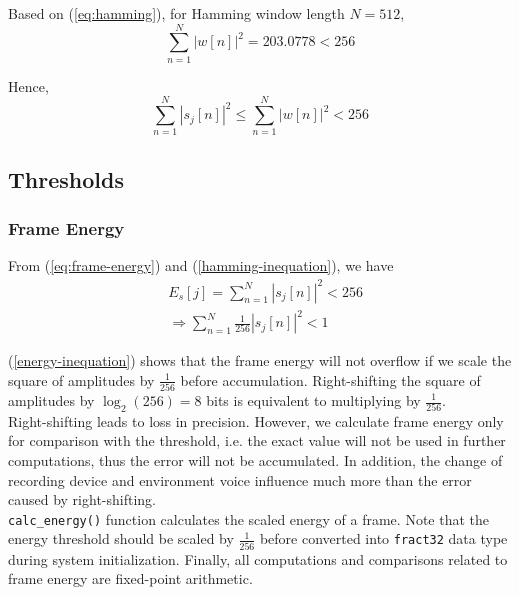 Based on (\ref{eq:hamming}), for Hamming window length $N = 512$,
\begin{equation}
\sum_{n=1}^{N} |w[n]|^2 = 203.0778 < 256
\end{equation}

Hence,
\begin{equation}
\label{hamming-inequation}
\sum_{n=1}^{N} |s_j[n]|^2 \le \sum_{n=1}^{N} |w[n]|^2 < 256
\end{equation}


\subsection{Thresholds}
\subsubsection{Frame Energy}

From (\ref{eq:frame-energy}) and (\ref{hamming-inequation}), we have
\begin{align}
\label{energy-inequation}
&E_s[j] = \sum_{n=1}^{N} |s_j[n]|^2 < 256\\
&\Longrightarrow \sum_{n=1}^{N} \frac{1}{256} |s_j[n]|^2 < 1
\end{align}

(\ref{energy-inequation}) shows that the frame energy will not overflow if we scale the square of amplitudes by $\frac{1}{256}$ before accumulation. Right-shifting the square of amplitudes by $\log_2(256) = 8$ bits is equivalent to multiplying by $\frac{1}{256}$.\\

Right-shifting leads to loss in precision. However, we calculate frame energy only for comparison with the threshold, i.e. the exact value will not be used in further computations, thus the error will not be accumulated. In addition, the change of recording device and environment voice influence much more than the error caused by right-shifting.\\

\texttt{calc\_energy()} function calculates the scaled energy of a frame. Note that the energy threshold should be scaled by $\frac{1}{256}$ before converted into \texttt{fract32} data type during system initialization. Finally, all computations and comparisons related to frame energy are fixed-point arithmetic.


